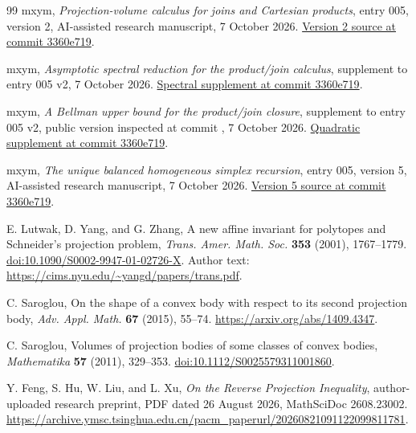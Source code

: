\documentclass[11pt]{article}
\theoremstyle{remark}
\newcommand{\code}[1]{\texttt{\detokenize{#1}}}
\begin{document}
\begin{thebibliography}{99}
mxym, \emph{Projection-volume calculus for joins and Cartesian products}, entry 005, version 2, AI-assisted research manuscript, 7 October 2026.
\href{https://github.com/mxym/math/blob/3360e7191cf564a46d09edcbfbd107c9178bd98f/preprints/005-simplex-product-optimum/v2/paper.md}{Version 2 source at commit 3360e719}.

mxym, \emph{Asymptotic spectral reduction for the product/join calculus}, supplement to entry 005 v2, 7 October 2026.
\href{https://github.com/mxym/math/blob/3360e7191cf564a46d09edcbfbd107c9178bd98f/preprints/005-simplex-product-optimum/v2/ASYMPTOTIC_SPECTRAL_REDUCTION.md}{Spectral supplement at commit 3360e719}.

mxym, \emph{A Bellman upper bound for the product/join closure}, supplement to entry 005 v2, public version inspected at commit \code{3360e719}, 7 October 2026.
\href{https://github.com/mxym/math/blob/3360e7191cf564a46d09edcbfbd107c9178bd98f/preprints/005-simplex-product-optimum/v2/BELLMAN_UPPER_BOUND.md}{Quadratic supplement at commit 3360e719}.

mxym, \emph{The unique balanced homogeneous simplex recursion}, entry 005, version 5, AI-assisted research manuscript, 7 October 2026.
\href{https://github.com/mxym/math/blob/3360e7191cf564a46d09edcbfbd107c9178bd98f/preprints/005-simplex-product-optimum/v5/paper.md}{Version 5 source at commit 3360e719}.

E. Lutwak, D. Yang, and G. Zhang, A new affine invariant for polytopes and Schneider's projection problem, \emph{Trans. Amer. Math. Soc.} \textbf{353} (2001), 1767--1779.
\href{https://doi.org/10.1090/S0002-9947-01-02726-X}{doi:10.1090/S0002-9947-01-02726-X}.
Author text: \url{https://cims.nyu.edu/~yangd/papers/trans.pdf}.

C. Saroglou, On the shape of a convex body with respect to its second projection body, \emph{Adv. Appl. Math.} \textbf{67} (2015), 55--74.
\url{https://arxiv.org/abs/1409.4347}.

C. Saroglou, Volumes of projection bodies of some classes of convex bodies, \emph{Mathematika} \textbf{57} (2011), 329--353.
\href{https://doi.org/10.1112/S0025579311001860}{doi:10.1112/S0025579311001860}.

Y. Feng, S. Hu, W. Liu, and L. Xu, \emph{On the Reverse Projection Inequality}, author-uploaded research preprint, PDF dated 26 August 2026, MathSciDoc 2608.23002.
\url{https://archive.ymsc.tsinghua.edu.cn/pacm_paperurl/20260821091122099811781}.


\end{thebibliography}
\end{document}
